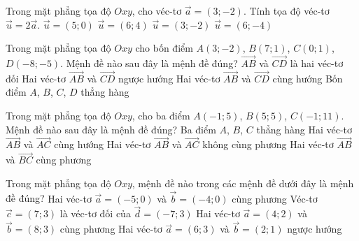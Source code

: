 \begin{ex}%
	Trong mặt phẳng tọa độ $Oxy$, cho véc-tơ $\vec{a}=(3;-2)$. Tính tọa độ véc-tơ $\vec{u}=2\vec{a}$.
	\choice
	{$\vec{u}=(5;0)$}
	{$\vec{u}=(6;4)$}
	{$\vec{u}=(3;-2)$}
	{\True $\vec{u}=(6;-4)$}
\end{ex}

\begin{ex}%
	Trong mặt phẳng tọa độ $Oxy$ cho bốn điểm $A(3;-2)$, $B(7;1)$, $C(0;1)$, $D(-8;-5)$. Mệnh đề nào sau đây là mệnh đề đúng?
	\choice
	{$\vec{AB}$ và $\vec{CD}$ là hai véc-tơ đối}
	{\True Hai véc-tơ $\vec{AB}$ và $\vec{CD}$ ngược hướng}
	{Hai véc-tơ $\vec{AB}$ và $\vec{CD}$ cùng hướng}
	{Bốn điểm $A$, $B$, $C$, $D$ thẳng hàng}
\end{ex}

\begin{ex}%
	Trong mặt phẳng tọa độ $Oxy$, cho ba điểm $A(-1;5)$, $B(5;5)$, $C(-1;11)$. Mệnh đề nào sau đây là mệnh đề đúng?
	\choice
	{Ba điểm $A$, $B$, $C$ thẳng hàng}
	{Hai véc-tơ $\vec{AB}$ và $\vec{AC}$ cùng hướng}
	{\True Hai véc-tơ $\vec{AB}$ và $\vec{AC}$ không cùng phương}
	{Hai véc-tơ $\vec{AB}$ và $\vec{BC}$ cùng phương}
\end{ex}

\begin{ex}%
	Trong mặt phẳng tọa độ $Oxy$, mệnh đề nào trong các mệnh đề dưới đây là mệnh đề đúng?
	\choice
	{\True Hai véc-tơ $\vec{a}=(-5;0)$ và $\vec{b} =(-4;0)$ cùng phương}
	{Véc-tơ $\vec{c} =(7;3)$ là véc-tơ đối của $\vec{d} =(-7;3)$}
	{Hai véc-tơ $\vec{a} =(4;2)$ và $\vec{b} =(8;3)$ cùng phương}
	{Hai véc-tơ $\vec{a} =(6;3)$ và $\vec{b} =(2;1)$ ngược hướng}
\end{ex}

